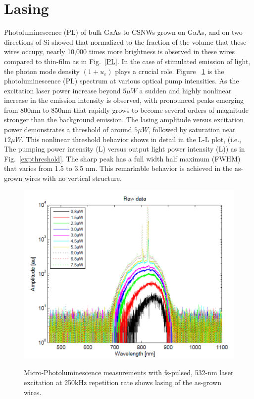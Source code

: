 \section{Lasing} \label{data_lasing}

Photoluminescence (PL) of bulk GaAs to CSNWs grown on GaAs, and on two
directions of Si showed that normalized to the fraction of the volume that
these wires occupy, nearly 10,000 times more brightness is observed in these
wires compared to thin-film as in Fig.~\ref{PL}. In the case of stimulated
emission of light, the photon mode density $(1+u_\varepsilon)$ plays a crucial
role. Figure ~\ref{lasing} is the photoluminescence (PL) spectrum at various
optical pump intensities. As the excitation laser power increase beyond
$5{\mu}W$ a sudden and highly nonlinear increase in the emission intensity is
observed, with pronounced peaks emerging from 800nm to 850nm that rapidly grows
to become several orders of magnitude stronger than the background emission.
The lasing amplitude versus excitation power demonstrates a threshold of around
$5{\mu}W$, followed by saturation near $12{\mu}W$. This nonlinear threshold
behavior shows in detail in the L-L plot, (i.e., The pumping power intensity
(L) versus output light power intensity (L)) as in Fig.~\ref{expthreshold}. The
sharp peak has a full width half maximum (FWHM) that varies from 1.5 to 3.5 nm.
This remarkable behavior is achieved in the as-grown wires with no vertical
structure.

\begin{figure}
  \caption{Micro-Photoluminescence measurements with fs-pulsed, 532-nm laser excitation at 250kHz repetition rate shows lasing of the as-grown wires.}
  \centering
  \includegraphics[width=\textwidth]{pictures/Data/lasing}
  \label{lasing}
\end{figure}

